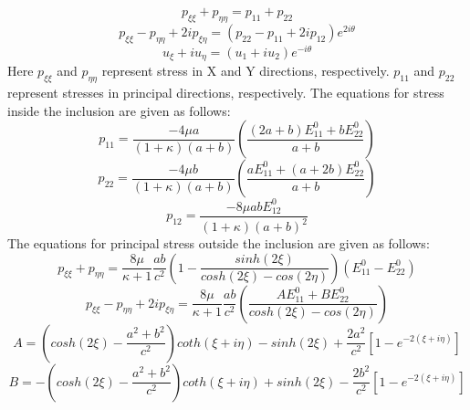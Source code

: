\documentclass[12pt, a4paper]{report}
\begin{document}
\begin{equation}
    p_{\xi\xi} + p_{\eta\eta} = p_{11} + p_{22}
\end{equation}
\begin{equation}
    p_{\xi\xi} - p_{\eta\eta} + 2ip_{\xi\eta} = (p_{22} - p_{11} + 2ip_{12})e^{2i\theta}
\end{equation}
\begin{equation}
    u_{\xi} + iu_{\eta} = (u_{1} + iu_{2})e^{-i\theta}
\end{equation}
Here $p_{\xi\xi}$ and $p_{\eta\eta}$ represent stress in X and Y directions, respectively. $p_{11}$ and $ p_{22}$ represent stresses in principal directions, respectively.
The equations for stress inside the inclusion are given as follows:
\begin{equation}
    p_{11} = \frac{-4\mu a}{(1+\kappa)(a+b)} \left( \frac{(2a+b)E^{0}_{11} + bE^0_{22}}{a+b} \right)
\end{equation}
\begin{equation}
    p_{22} = \frac{-4\mu b}{(1+\kappa)(a+b)} \left(\frac{aE^{0}_{11} + (a+2b)E^0_{22}}{a+b}\right)
\end{equation}
\begin{equation}
    p_{12} = \frac{-8\mu abE^0_{12}}{(1+\kappa)(a+b)^2}
\end{equation}
The equations for principal stress outside the inclusion are given as follows:
\begin{equation}
    p_{\xi\xi} + p_{\eta\eta} = \frac{8\mu}{\kappa + 1} \frac{ab}{c^2} \left(1 - \frac{sinh (2\xi)}{cosh (2\xi) - cos (2\eta)}\right) (E^0_{11} - E^0_{22})
\end{equation}
\begin{equation}
    p_{\xi\xi} - p_{\eta\eta} + 2ip_{\xi\eta} = \frac{8\mu}{\kappa + 1} \frac{ab}{c^2} \left(\frac{AE^0_{11} + BE^0_{22}}{cosh (2\xi) - cos (2\eta)}\right)
\end{equation}
\begin{equation}
    A = \left( cosh(2\xi) - \frac{a^2 + b^2}{c^2} \right) coth(\xi + i\eta) - sinh(2\xi) + \frac{2a^2}{c^2}[1-e^{-2(\xi + i\eta)}]
\end{equation}
\begin{equation}
    B = -\left( cosh(2\xi) - \frac{a^2 + b^2}{c^2} \right) coth(\xi + i\eta) + sinh(2\xi) - \frac{2b^2}{c^2}[1-e^{-2(\xi + i\eta)}]
\end{equation}
\end{document}
